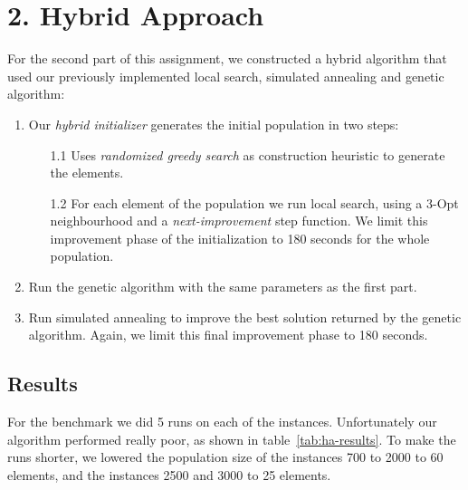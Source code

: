 \pagebreak
\section*{2. Hybrid Approach}
For the second part of this assignment, we constructed a hybrid algorithm that used our previously implemented local search, simulated annealing and genetic algorithm:
\begin{enumerate}
	\item Our \textit{hybrid initializer} generates the initial population in two steps:
	\begin{enumerate}
		\item[1.1] Uses \textit{randomized greedy search} as construction heuristic to generate the elements. 
		\item[1.2] For each element of the population we run local search, using a 3-Opt neighbourhood and a \textit{next-improvement} step function. We limit this improvement phase of the initialization to 180 seconds for the whole population.
	\end{enumerate}
	\item Run the genetic algorithm with the same parameters as the first part.
	\item Run simulated annealing to improve the best solution returned by the genetic algorithm. Again, we limit this final improvement phase to 180 seconds.
\end{enumerate}


\subsection*{Results}
For the benchmark we did 5 runs on each of the instances. Unfortunately our algorithm performed really poor, as shown in table~\ref{tab:ha-results}. To make the runs shorter, we lowered the population size of the instances 700 to 2000 to 60 elements, and the instances 2500 and 3000 to 25 elements.

